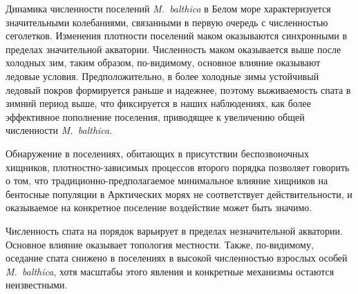 Динамика численности поселений {\it M.~balthica} в Белом море характеризуется значительными колебаниями, связанными в первую очередь с численностью сеголетков. Изменения плотности поселений маком оказываются синхронными в пределах значительной акватории.
Численность маком оказывается выше после холодных зим, таким образом, по-видимому, основное влияние оказывают ледовые условия.
Предположительно, в более холодные зимы устойчивый ледовый покров формируется раньше и надежнее, поэтому выживаемость спата в зимний период выше, что фиксируется в наших наблюдениях, как более эффективное пополнение поселения, приводящее к увеличению общей численности {\it M.~balthica}.

Обнаружение в поселениях, обитающих в присутствии беспозвоночных хищников, плотностно-зависимых процессов второго порядка позволяет говорить о том, что традиционно-предполагаемое минимальное влияние хищников на бентосные популяции в Арктических морях не соответствует действительности, и оказываемое на конкретное поселение воздействие может быть значимо.

Численность спата на порядок варьирует в пределах незначительной акватории.
Основное влияние оказывает топология местности.
Также, по-видимому, оседание спата снижено в поселениях в высокой численностью взрослых особей {\it M.~balthica}, хотя масштабы этого явления и конкретные механизмы остаются неизвестными.


